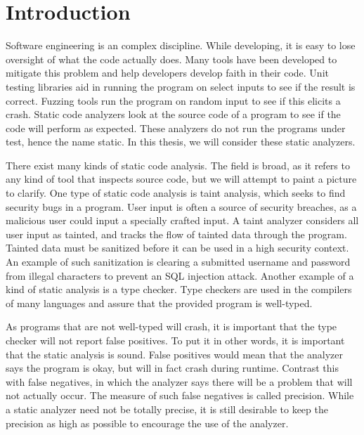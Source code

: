 \section{Introduction}
Software engineering is an complex discipline. While developing, it
is easy to lose oversight of what the code actually does. 
Many tools have been developed to mitigate this problem and help developers
develop faith in their code.
Unit testing libraries aid in running the program on select inputs to see 
if the result is correct. Fuzzing tools run the
program on random input to see if this elicits a crash. 
Static code analyzers look at the source code of a program to see if
the code will perform as expected. These analyzers do not run the programs under
test, hence the name static. In this thesis, we will consider these static
analyzers.

There exist many kinds of static code analysis. The field is broad, as it
refers to any kind of tool that inspects source code, but we will attempt to
paint a picture to clarify. One type of static code analysis is taint analysis,
which seeks to find security bugs in a program. User input is often a source of
security breaches, as a malicious user could input a specially crafted input. A
taint analyzer considers all user input as tainted, and tracks the flow of
tainted data through the program. Tainted data must be sanitized before it
can be used in a high security context. An example of such sanitization is
clearing a submitted username and password from illegal characters to prevent
an SQL injection attack. Another example of a kind of static analysis is a 
type checker. Type checkers are used in the compilers of many languages and 
assure that the provided program is well-typed. 

As programs that are not well-typed will crash, it is important
that the type checker will not report false positives. To put it in other 
words, it is important that the static analysis is sound. False positives would
mean that the analyzer says the program is okay, but will in fact crash during
runtime. Contrast this with false negatives, in which the analyzer says there
will be a problem that will not actually occur. The measure of such false
negatives is called precision. While a static analyzer need not be totally
precise, it is still desirable to keep the precision as high as possible to
encourage the use of the analyzer.

